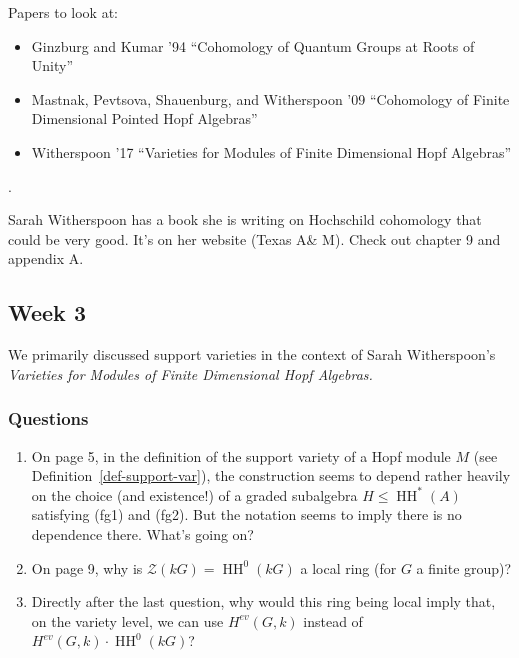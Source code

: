 \documentclass[12pt]{article}
\theoremstyle{nonumberbreak}
\theoremstyle{changebreak}
\theoremstyle{nonumberplain}
\theoremstyle{change}
\DeclareMathOperator{\HH}{HH}
\begin{document}
Papers to look at:
\begin{itemize}
	\item Ginzburg and Kumar '94 ``Cohomology of Quantum Groups at Roots of Unity'' \cite{ginzburg-kumar}
	\item Mastnak, Pevtsova, Shauenburg, and Witherspoon '09 ``Cohomology of Finite Dimensional Pointed Hopf Algebras''\cite{julia10-pointed}
	\item Witherspoon '17 ``Varieties for Modules of Finite Dimensional Hopf Algebras''\cite{witherspoon-expository}
\end{itemize}. 

Sarah Witherspoon has a book she is writing on Hochschild cohomology that could be very good. It's on her website (Texas A\& M). Check out chapter 9 and appendix A.

\subsection{Week 3}
We primarily discussed support varieties in the context of Sarah Witherspoon's \textit{Varieties for Modules of Finite Dimensional Hopf Algebras.}\cite{witherspoon-expository}

\subsubsection{Questions}
\begin{enumerate}
	\item On page 5, in the definition of the support variety of a Hopf module $M$ (see Definition~\ref{def-support-var}),
	the construction seems to depend rather heavily on the choice (and existence!) of a graded subalgebra $H\le \HH^*(A)$
	satisfying (fg1) and (fg2). But the notation seems to imply there is no dependence there. What's going on?
	\item On page 9, why is $\mathcal{Z}(kG)=\HH^0(kG)$ a local ring (for $G$ a finite group)?
	\item Directly after the last question, why would this ring being local imply that, on the variety level,
	we can use $H^{ev}(G,k)$ instead of $H^{ev}(G,k)\cdot \HH^0(kG)$?
\end{enumerate}
\end{document}

